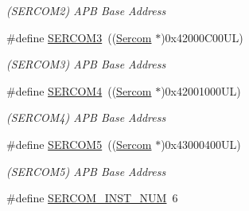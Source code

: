 \begin{DoxyCompactItemize}
\begin{DoxyCompactList}\small\item\em (S\+E\+R\+C\+O\+M2) A\+P\+B Base Address \end{DoxyCompactList}\item 
\hypertarget{group___s_a_m_l21_j18_a__base_gac9f8240be5a40b46cb09617323ebc7e3}{}\#define \hyperlink{group___s_a_m_l21_j18_a__base_gac9f8240be5a40b46cb09617323ebc7e3}{S\+E\+R\+C\+O\+M3}~((\hyperlink{union_sercom}{Sercom}   $\ast$)0x42000\+C00\+U\+L)\label{group___s_a_m_l21_j18_a__base_gac9f8240be5a40b46cb09617323ebc7e3}

\begin{DoxyCompactList}\small\item\em (S\+E\+R\+C\+O\+M3) A\+P\+B Base Address \end{DoxyCompactList}\item 
\hypertarget{group___s_a_m_l21_j18_a__base_gad48343faa88820b8f552aa1eaf66f00a}{}\#define \hyperlink{group___s_a_m_l21_j18_a__base_gad48343faa88820b8f552aa1eaf66f00a}{S\+E\+R\+C\+O\+M4}~((\hyperlink{union_sercom}{Sercom}   $\ast$)0x42001000\+U\+L)\label{group___s_a_m_l21_j18_a__base_gad48343faa88820b8f552aa1eaf66f00a}

\begin{DoxyCompactList}\small\item\em (S\+E\+R\+C\+O\+M4) A\+P\+B Base Address \end{DoxyCompactList}\item 
\hypertarget{group___s_a_m_l21_j18_a__base_ga8785a316e608cb0a218f2a59655d6037}{}\#define \hyperlink{group___s_a_m_l21_j18_a__base_ga8785a316e608cb0a218f2a59655d6037}{S\+E\+R\+C\+O\+M5}~((\hyperlink{union_sercom}{Sercom}   $\ast$)0x43000400\+U\+L)\label{group___s_a_m_l21_j18_a__base_ga8785a316e608cb0a218f2a59655d6037}

\begin{DoxyCompactList}\small\item\em (S\+E\+R\+C\+O\+M5) A\+P\+B Base Address \end{DoxyCompactList}\item 
\hypertarget{group___s_a_m_l21_j18_a__base_ga75f7d8cff25db3f1353efb6f7990fce5}{}\#define \hyperlink{group___s_a_m_l21_j18_a__base_ga75f7d8cff25db3f1353efb6f7990fce5}{S\+E\+R\+C\+O\+M\+\_\+\+I\+N\+S\+T\+\_\+\+N\+U\+M}~6\label{group___s_a_m_l21_j18_a__base_ga75f7d8cff25db3f1353efb6f7990fce5}


\end{DoxyCompactItemize}
